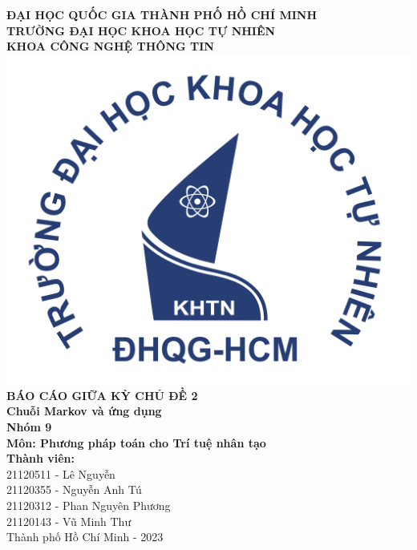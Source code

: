\begin{titlepage}
    \begin{center}
    \textsc{\small \textbf{ĐẠI HỌC QUỐC GIA THÀNH PHỐ HỒ CHÍ MINH}}\\
    \textsc{\small \textbf{TRƯỜNG ĐẠI HỌC KHOA HỌC TỰ NHIÊN}}\\
    \textsc{\small \textbf{KHOA CÔNG NGHỆ THÔNG TIN}}\\[1.5cm]
    \includegraphics[width=.3\textwidth]{figure/logo.png}\\[2cm]
    {\fontsize{20}{20}\selectfont\bfseries BÁO CÁO GIỮA KỲ CHỦ ĐỀ 2 \\[10pt]
    Chuỗi Markov và ứng dụng}\\[2cm]%
    \textbf{Nhóm 9 \\[5pt]
    Môn: Phương pháp toán cho Trí tuệ nhân tạo}\\[2cm]
    \textbf{Thành viên:} \\
    21120511 - Lê Nguyễn \\
    21120355 - Nguyễn Anh Tú \\
    21120312 - Phan Nguyên Phương \\
    21120143 - Vũ Minh Thư \\[3.5cm]
    Thành phố Hồ Chí Minh - 2023
    \end{center}
    
    \vfill
    \pagebreak
\end{titlepage}